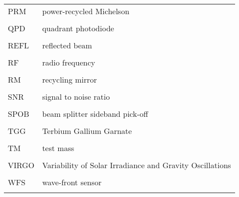 \singlespacing
\begin{tabular}{lp{5in}}
PRM & power-recycled Michelson \\
\\
QPD & quadrant photodiode \\
\\ 
REFL & reflected beam \\
\\
 RF & radio frequency \\
\\
 RM & recycling mirror \\
\\
 SNR & signal to noise ratio \\
\\
SPOB & beam splitter sideband pick-off \\
\\
TGG & Terbium Gallium Garnate \\
\\
TM & test mass \\
\\
VIRGO & Variability of Solar Irradiance and Gravity Oscillations \\
\\
WFS & wave-front sensor \\
\\
\end{tabular}
\doublespacing

